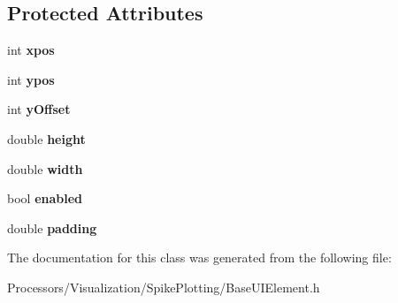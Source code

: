 \subsection*{Protected Attributes}
\begin{DoxyCompactItemize}
\item 
\hypertarget{classBaseUIElement_ad65449ac10a833a2ecf48315b17bfbba}{int {\bfseries xpos}}\label{classBaseUIElement_ad65449ac10a833a2ecf48315b17bfbba}

\item 
\hypertarget{classBaseUIElement_a730d67d2f53f256ffcd2caf2db166f59}{int {\bfseries ypos}}\label{classBaseUIElement_a730d67d2f53f256ffcd2caf2db166f59}

\item 
\hypertarget{classBaseUIElement_a23a5dcf0e8fe642f779b0fe73f02584f}{int {\bfseries y\-Offset}}\label{classBaseUIElement_a23a5dcf0e8fe642f779b0fe73f02584f}

\item 
\hypertarget{classBaseUIElement_a4fc207e53cafb2e7a072ba1ea931eff3}{double {\bfseries height}}\label{classBaseUIElement_a4fc207e53cafb2e7a072ba1ea931eff3}

\item 
\hypertarget{classBaseUIElement_a913b0634330b02a5aa2d0dad22982cc4}{double {\bfseries width}}\label{classBaseUIElement_a913b0634330b02a5aa2d0dad22982cc4}

\item 
\hypertarget{classBaseUIElement_acb44180764682ab3f5690373549e4cae}{bool {\bfseries enabled}}\label{classBaseUIElement_acb44180764682ab3f5690373549e4cae}

\item 
\hypertarget{classBaseUIElement_a4dca2aac9fd607791c7702d8fedb4bb2}{double {\bfseries padding}}\label{classBaseUIElement_a4dca2aac9fd607791c7702d8fedb4bb2}

\end{DoxyCompactItemize}


The documentation for this class was generated from the following file\-:\begin{DoxyCompactItemize}
\item 
Processors/\-Visualization/\-Spike\-Plotting/Base\-U\-I\-Element.\-h\end{DoxyCompactItemize}
